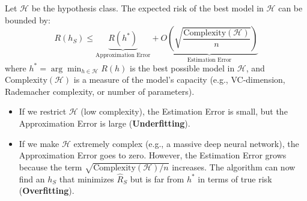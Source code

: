 \documentclass[11pt]{article}
\begin{document}
Let \(\mathcal{H}\) be the hypothesis class. The expected risk of the best model in \(\mathcal{H}\) can be bounded by:
\[
 R(h_S) \le \underbrace{R(h^*)}_{\text{Approximation Error}} + \underbrace{O\left(\sqrt{\frac{\text{Complexity}(\mathcal{H})}{n}}\right)}_{\text{Estimation Error}} 
\]
where \(h^* = \arg\min_{h \in \mathcal{H}} R(h)\) is the best possible model in \(\mathcal{H}\), and \(\text{Complexity}(\mathcal{H})\) is a measure of the model's capacity (e.g., VC-dimension, Rademacher complexity, or number of parameters).

\begin{itemize}
    \item If we restrict \(\mathcal{H}\) (low complexity), the Estimation Error is small, but the Approximation Error is large (\textbf{Underfitting}).
    \item If we make \(\mathcal{H}\) extremely complex (e.g., a massive deep neural network), the Approximation Error goes to zero. However, the Estimation Error grows because the term \(\sqrt{\text{Complexity}(\mathcal{H})/n}\) increases. The algorithm can now find an \(h_S\) that minimizes \(\hat{R}_S\) but is far from \(h^*\) in terms of true risk (\textbf{Overfitting}).
\end{itemize}
\end{document}
